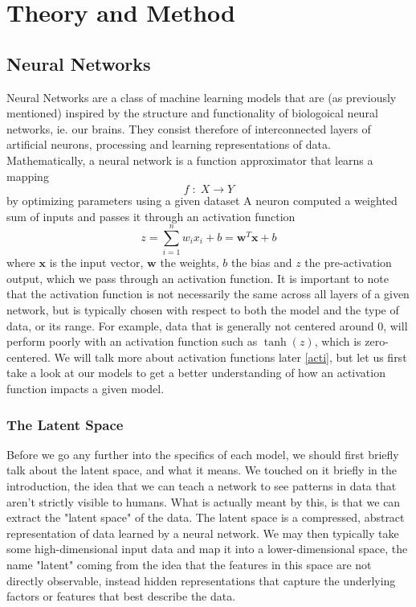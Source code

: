 \documentclass{article}
\begin{document}
\section{Theory and Method}
\subsection{Neural Networks}
Neural Networks are a class of machine learning models that are (as previously mentioned) inspired by the structure and functionality of biologoical neural networks, ie. our brains. They consist therefore of interconnected layers of artificial neurons, processing and learning representations of data. Mathematically, a neural network is a function approximator that learns a mapping
\begin{equation}
    f \; :\; X \xrightarrow{} Y
\end{equation}
by optimizing parameters using a given dataset \newline
A neuron computed a weighted sum of inputs and passes it through an activation function
\begin{equation}
    z = \sum_{i=1}^n w_i x_i + b = \boldsymbol{w}^T \boldsymbol{x} + b
\end{equation}
where $\boldsymbol{x}$ is the input vector, $\boldsymbol{w}$ the weights, $b$ the bias and $z$ the pre-activation output, which we pass through an activation function.
\newline
It is important to note that the activation function is not necessarily the same across all layers of a given network, but is typically chosen with respect to both the model and the type of data, or its range. For example, data that is generally not centered around 0, will perform poorly with an activation function such as $\tanh(z)$, which is zero-centered. We will talk more about activation functions later \ref{acti}, but let us first take a look at our models to get a better understanding of how an activation function impacts a given model.
\subsubsection{The Latent Space}
Before we go any further into the specifics of each model, we should first briefly talk about the latent space, and what it means. We touched on it briefly in the introduction, the idea that we can teach a network to see patterns in data that aren't strictly visible to humans. What is actually meant by this, is that we can extract the "latent space" of the data. The latent space is a compressed, abstract representation of data learned by a neural network. We may then typically take some high-dimensional input data and map it into a lower-dimensional space, the name "latent" coming from the idea that the features in this space are not directly observable, instead hidden representations that capture the underlying factors or features that best describe the data.
\end{document}
